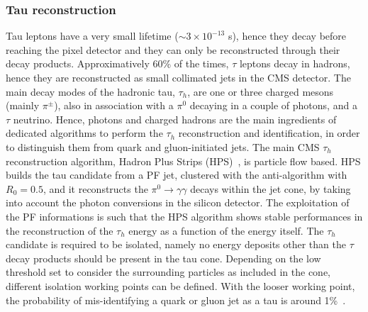 
\subsubsection{Tau reconstruction}
\noindent Tau leptons have a very small lifetime ($\sim 3 \times 10^{-13}$ s), hence they decay before reaching the pixel detector and they can only be reconstructed through their decay products. Approximatively 60\% of the times, $\tau$ leptons decay in hadrons, hence they are reconstructed as small collimated jets in the CMS detector. The main decay modes of the hadronic tau, $\tau_h$, are one or three charged mesons (mainly $\pi^{\pm}$), also in association with a $\pi^0$ decaying in a couple of photons, and a $\tau$ neutrino. Hence, photons and charged hadrons are the main ingredients of dedicated algorithms to perform the $\tau_h$ reconstruction and identification, in order to distinguish them from quark and gluon-initiated jets. The main CMS $\tau_h$ reconstruction algorithm, Hadron Plus Strips (HPS)~\cite{Chatrchyan:2012zz}, is particle flow based. HPS builds the tau candidate from a PF jet, clustered with the anti-\kt algorithm with $R_0 = 0.5$, and it reconstructs the $\pi^0 \rightarrow \gamma \gamma$ decays within the jet cone, by taking into account the photon conversions in the silicon detector. The exploitation of the PF informations is such that the HPS algorithm shows stable performances in the reconstruction of the $\tau_h$ energy as a function of the energy itself. The $\tau_h$ candidate is required to be isolated, namely no energy deposits other than the $\tau$ decay products should be present in the tau cone. Depending on the low threshold set to consider the surrounding particles as included in the cone, different isolation working points can be defined. With the looser working point, the probability of mis-identifying a quark or gluon jet as a tau is around 1\%~\cite{Chatrchyan:2012zz}.

